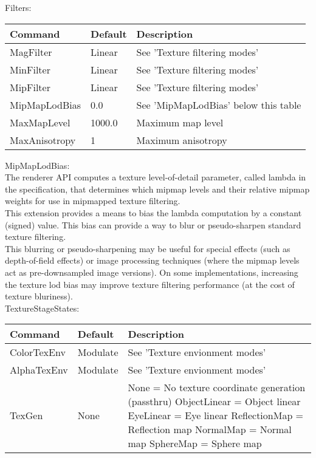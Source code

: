 Filters:\\
\begin{tabular}{|p{2.5cm}|p{2.5cm}|p{9cm}|}
\hline
\textbf{Command} & \textbf{Default} & \textbf{Description}\\
\hline
MagFilter     & Linear & See 'Texture filtering modes'\\
\hline
MinFilter     & Linear & See 'Texture filtering modes'\\
\hline
MipFilter     & Linear & See 'Texture filtering modes'\\
\hline
MipMapLodBias & 0.0    & See 'MipMapLodBias' below this table\\
\hline
MaxMapLevel   & 1000.0 & Maximum map level\\
\hline
MaxAnisotropy & 1      & Maximum anisotropy\\
\hline
\end{tabular}


MipMapLodBias:\\
The renderer API computes a texture level-of-detail parameter, called lambda
in the specification, that determines which mipmap levels and
their relative mipmap weights for use in mipmapped texture filtering.\\

This extension provides a means to bias the lambda computation
by a constant (signed) value.  This bias can provide a way to blur
or pseudo-sharpen standard texture filtering.\\

This blurring or pseudo-sharpening may be useful for special effects
(such as depth-of-field effects) or image processing techniques
(where the mipmap levels act as pre-downsampled image versions).
On some implementations, increasing the texture lod bias may improve
texture filtering performance (at the cost of texture bluriness).\\


TextureStageStates:\\
\begin{tabular}{|p{2.5cm}|p{2.5cm}|p{9cm}|}
\hline
\textbf{Command} & \textbf{Default} & \textbf{Description}\\
\hline
ColorTexEnv & Modulate & See 'Texture envionment modes'\\
\hline
AlphaTexEnv & Modulate & See 'Texture envionment modes'\\
\hline
TexGen      & None     & None          = No texture coordinate generation (passthru)\newline
                         ObjectLinear  = Object linear\newline
                         EyeLinear     = Eye linear\newline
                         ReflectionMap = Reflection map\newline
                         NormalMap     = Normal map\newline
                         SphereMap     = Sphere map\newline\\
\hline
\end{tabular}



